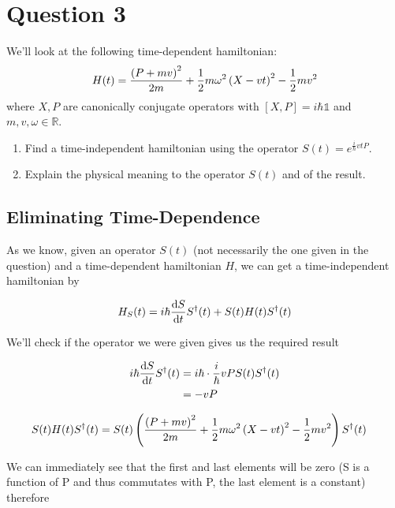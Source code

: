 \clearpage
\section{Question 3}
\begin{colbox}
	We'll look at the following time-dependent hamiltonian:
	\begin{equation*}
		H(t) = \frac{\left(P+mv\right)^2}{2m}+\frac{1}{2}m\omega^2\left(X-vt\right)^2-\frac{1}{2}mv^2
	\end{equation*}
	where $X,P$ are canonically conjugate operators with $[X,P]=i\hbar\mathds{1}$ and $m,v,\omega \in \mathds{R}$.
	\begin{enumerate}
		\item Find a time-independent hamiltonian using the operator $S(t) = e^{\frac{i}{\hbar}vtP}$.
		\item Explain the physical meaning to the operator $S(t)$ and of the result.
	\end{enumerate} 
\end{colbox}

\subsection{Eliminating Time-Dependence}

As we know, given an operator $S(t)$ (not necessarily the one given in the question) and a time-dependent hamiltonian $H$, we can get a time-independent hamiltonian by

\begin{equation}
	H_S(t) = i\hbar\diff{S}{t}S^\dagger(t)+S(t)H(t)S^\dagger(t)
\end{equation}

We'll check if the operator we were given gives us the required result

\begin{align}
	i\hbar\diff{S}{t}S^\dagger(t) &= i\hbar\cdot\frac{i}{\hbar}vPS(t)S^\dagger(t)\\
	&= -vP
\end{align}

\begin{align}
	S(t)H(t)S^\dagger(t) &= S(t)\left(\frac{\left(P+mv\right)^2}{2m}+\frac{1}{2}m\omega^2\left(X-vt\right)^2-\frac{1}{2}mv^2\right)S^\dagger(t)
\end{align}

We can immediately see that the first and last elements will be zero (S is a function of P and thus commutates with P, the last element is a constant) therefore

